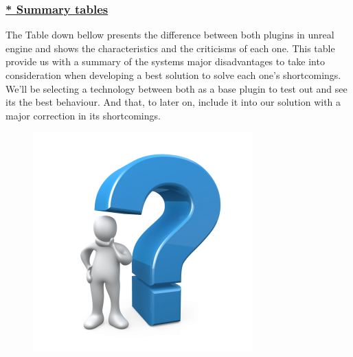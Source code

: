 \documentclass[12pt]{book}
\begin{document}
\subsubsection{\underline{* Summary tables}}
The Table down bellow presents the difference between both plugins in unreal engine and shows the characteristics and the criticisms of each one. This table provide us with a summary of the systems major disadvantages to take into consideration when developing a best solution to solve each one's shortcomings.
We'll be selecting a technology between both as a base plugin to test out and see its the best behaviour. And that, to later on, include it into our solution with a major correction in its shortcomings.
\begin{figure}[!h]
    \centering
    \includegraphics[scale=0.5]{./Figures/question.png}
\end{figure}
\newpage
\end{document}
